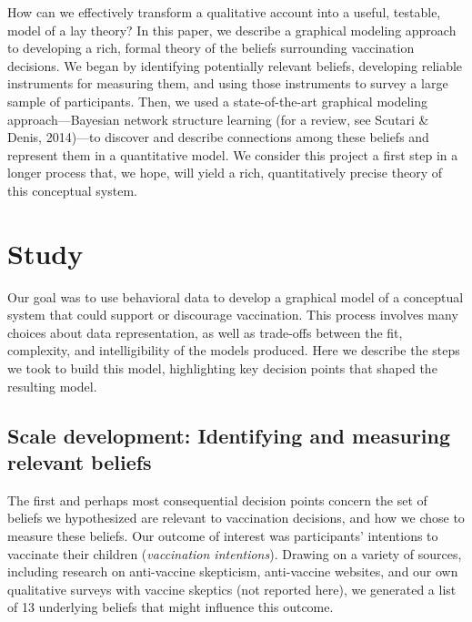 \documentclass[10pt, letterpaper]{article}
\begin{document}
How can we effectively transform a qualitative account into a useful,
testable, model of a lay theory? In this paper, we describe a graphical
modeling approach to developing a rich, formal theory of the beliefs
surrounding vaccination decisions. We began by identifying potentially
relevant beliefs, developing reliable instruments for measuring them,
and using those instruments to survey a large sample of participants.
Then, we used a state-of-the-art graphical modeling approach---Bayesian
network structure learning (for a review, see Scutari \& Denis,
2014)---to discover and describe connections among these beliefs and
represent them in a quantitative model. We consider this project a first
step in a longer process that, we hope, will yield a rich,
quantitatively precise theory of this conceptual system.

\section{Study}\label{study}

Our goal was to use behavioral data to develop a graphical model of a
conceptual system that could support or discourage vaccination. This
process involves many choices about data representation, as well as
trade-offs between the fit, complexity, and intelligibility of the
models produced. Here we describe the steps we took to build this model,
highlighting key decision points that shaped the resulting model.

\subsection{Scale development: Identifying and measuring relevant
beliefs}\label{scale-development-identifying-and-measuring-relevant-beliefs}

The first and perhaps most consequential decision points concern the set
of beliefs we hypothesized are relevant to vaccination decisions, and
how we chose to measure these beliefs. Our outcome of interest was
participants' intentions to vaccinate their children (\emph{vaccination
intentions}). Drawing on a variety of sources, including research on
anti-vaccine skepticism, anti-vaccine websites, and our own qualitative
surveys with vaccine skeptics (not reported here), we generated a list
of 13 underlying beliefs that might influence this outcome.
\end{document}
